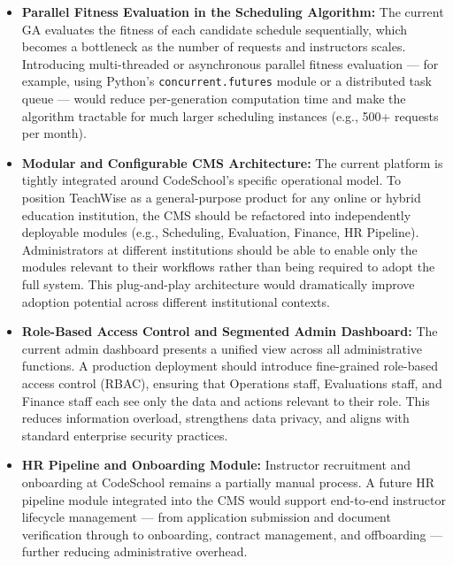 \begin{itemize}
    \item \textbf{Parallel Fitness Evaluation in the Scheduling Algorithm:} The current GA evaluates the fitness of each candidate schedule sequentially, which becomes a bottleneck as the number of requests and instructors scales. Introducing multi-threaded or asynchronous parallel fitness evaluation — for example, using Python's \texttt{concurrent.futures} module or a distributed task queue — would reduce per-generation computation time and make the algorithm tractable for much larger scheduling instances (e.g., 500+ requests per month).

    \item \textbf{Modular and Configurable CMS Architecture:} The current platform is tightly integrated around CodeSchool's specific operational model. To position TeachWise as a general-purpose product for any online or hybrid education institution, the CMS should be refactored into independently deployable modules (e.g., Scheduling, Evaluation, Finance, HR Pipeline). Administrators at different institutions should be able to enable only the modules relevant to their workflows rather than being required to adopt the full system. This plug-and-play architecture would dramatically improve adoption potential across different institutional contexts.

    \item \textbf{Role-Based Access Control and Segmented Admin Dashboard:} The current admin dashboard presents a unified view across all administrative functions. A production deployment should introduce fine-grained role-based access control (RBAC), ensuring that Operations staff, Evaluations staff, and Finance staff each see only the data and actions relevant to their role. This reduces information overload, strengthens data privacy, and aligns with standard enterprise security practices.

    \item \textbf{HR Pipeline and Onboarding Module:} Instructor recruitment and onboarding at CodeSchool remains a partially manual process. A future HR pipeline module integrated into the CMS would support end-to-end instructor lifecycle management — from application submission and document verification through to onboarding, contract management, and offboarding — further reducing administrative overhead.

\end{itemize}
